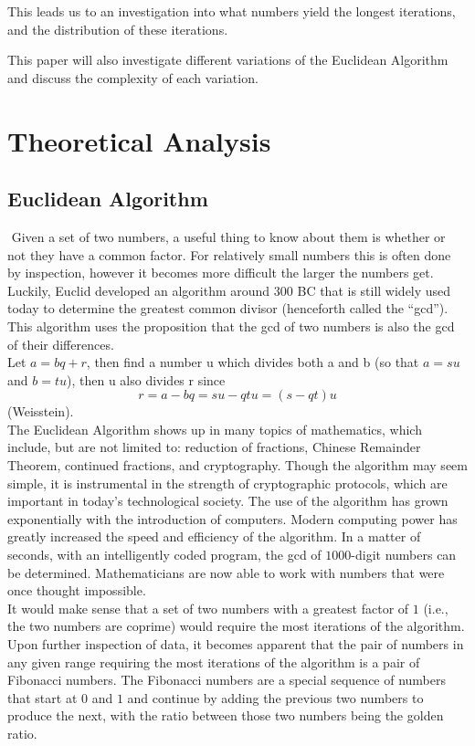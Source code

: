 \documentclass[11pt]{article}
\begin{document}
This leads us to an investigation into what numbers yield the longest iterations, and the distribution of these iterations. 

This paper will also investigate different variations of the Euclidean Algorithm and discuss the complexity of each variation. 


\section{Theoretical Analysis}
\subsection{Euclidean Algorithm}$ $
\indent Given a set of two numbers, a useful thing to know about them is whether or not they have a common factor.  For relatively small numbers this is often done by inspection, however it becomes more difficult the larger the numbers get.  Luckily, Euclid developed an algorithm around $300$ BC that is still widely used today to determine the greatest common divisor (henceforth called the “gcd”).  This algorithm uses the proposition that the gcd of two numbers is also the gcd of their differences.\\
       \indent Let $a=bq+r$, then find a number u which divides both a and b (so that $a = su$ and $b = tu$), then u also divides r since $$r = a - bq = su - qtu = (s - qt)u$$    (Weisstein).\\
       \indent The Euclidean Algorithm shows up in many topics of mathematics, which include, but are not limited to: reduction of fractions, Chinese Remainder Theorem, continued fractions, and cryptography. Though the algorithm may seem simple, it is instrumental in the strength of cryptographic protocols, which are important in today’s technological society. The use of the algorithm has grown exponentially with the introduction of computers. Modern computing power has greatly increased the speed and efficiency of the algorithm. In a matter of seconds, with an intelligently coded program, the gcd of $1000$-digit numbers can be determined.  Mathematicians are now able to work with numbers that were once thought impossible.      \\
	  \indent It would make sense that a set of two numbers with a greatest factor of $1$ (i.e., the two numbers are coprime) would require the most iterations of the algorithm.  Upon further inspection of data, it becomes apparent that the pair of numbers in any given range requiring the most iterations of the algorithm is a pair of Fibonacci numbers.  The Fibonacci numbers are a special sequence of numbers that start at $0$ and $1$ and continue by adding the previous two numbers to produce the next, with the ratio between those two numbers being the golden ratio.  
\end{document}
